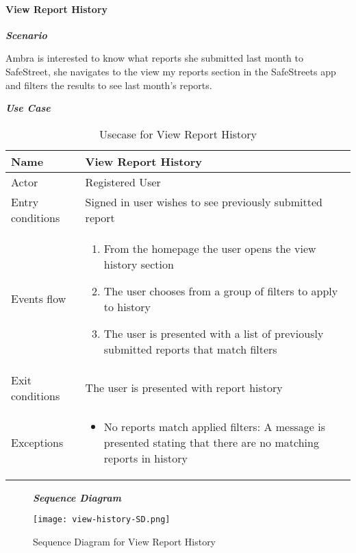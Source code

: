 \paragraph{View Report History}
\hfill \break

\begin{flushleft}\emph{\textbf{Scenario}}\end{flushleft}

Ambra is interested to know what reports she submitted last month to SafeStreet, she navigates to the view my reports section in the SafeStreets app and filters the results to see last month’s reports.


\begin{table}[H]
\begin{flushleft}\emph{\textbf{Use Case}}\end{flushleft}
\footnotesize
\centering
\settowidth{}
\setlength\extrarowheight{2pt}
\begin{tabulary}{\textwidth}{|J|J|}
\hline
Name             & View Report History \\
\hline 
Actor            & Registered User \\ 
\hline 
Entry conditions & Signed in user wishes to see previously submitted report\\
\hline 
Events flow      & 
\begin{minipage}[t]{0.7\textwidth}
\begin{enumerate} 
\item From the homepage the user opens the view history section
\item The user chooses from a group of filters to apply to history
\item The user is presented with a list of previously submitted reports that match filters
\end{enumerate}
\end{minipage}\\
\hline
Exit conditions  & The user is presented with report history \\
\hline 
Exceptions       & 
\begin{minipage}[t]{0.8\textwidth}
\begin{itemize} 
\item No reports match applied filters: A message is presented stating that there are no matching reports in history
\end{itemize}
\end{minipage}\\
\hline
\end{tabulary}
\caption{\label{tab:Usecase-View-Report-History}Usecase for View Report History}
\end{table}

\begin{figure}[H]
\begin{flushleft}\emph{\textbf{Sequence Diagram}}\end{flushleft}
\caption{Sequence Diagram for View Report History}
\label{fig:SD-View-Report-History}
\centering
\texttt{[image: view-history-SD.png]}
\end{figure}
